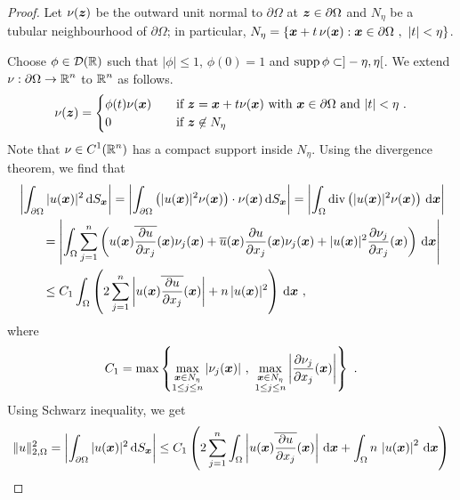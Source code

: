 \begin{proof}
Let $\nu({\bm{z}})$ be the outward unit normal to
$\partial \Omega$ at ${\bm{z}} \in \partial \Omega$ and
$N_\eta$ be a tubular neighbourhood of $\partial \Omega$; in
particular,
$\displaystyle N_\eta = \left\{ {\bm{x}} + t\, \nu({\bm{x}}) : {\bm{x}} \in
\partial \Omega \ , \ |t|<\eta \right\}$.

Choose $\displaystyle \phi \in \mathcal{D}(\mathbb{R})$ such that $|\phi|\leq 1$,
$\phi(0)=1$ and $\operatorname{supp} \phi \subset ]-\eta,\eta[$.
We extend $\displaystyle \nu:\partial \Omega \rightarrow \mathbb{R}^n$
to $\displaystyle \mathbb{R}^n$ as follows.
\[
\nu(\VEC{z}) =
\begin{cases}
\phi(t)\nu(\VEC{x}) & \quad \text{if}
\ \VEC{z} = \VEC{x}+t\nu(\VEC{x}) \ \text{with} \ 
\VEC{x} \in \partial \Omega\ \text{and} \ |t|<\eta \ . \\
0 & \quad \text{if}\ \VEC{z} \not\in N_\eta
\end{cases}
\]
Note that $\displaystyle \nu \in C^1(\mathbb{R}^n)$ has a compact support inside
$N_\eta$.  Using the divergence theorem, we find that
\begin{align*}
&\left| \int_{\partial \Omega} |u({\bm{x}})|^2 \,\mathrm{d}{S}_{{\bm{x}}} \right|
= \left| \int_{\partial \Omega} \left( |u({\bm{x}})|^2
\nu({\bm{x}})\right)\cdot \nu({\bm{x}}) \,\mathrm{d}{S}_{{\bm{x}}}
\right|
= \left| \int_{\Omega} \operatorname{div} \left( |u({\bm{x}})|^2
\nu({\bm{x}})\right) \,\mathrm{d}{{\bm{x}}} \right| \\
&\qquad = \left| \int_{\Omega} \sum_{j=1}^n
\left( u({\bm{x}}) \overline{\frac{\partial{u}}{\partial x_j}}({\bm{x}}) \nu_j({\bm{x}})
+ \overline{u}({\bm{x}}) \frac{\partial{u}}{\partial x_j}({\bm{x}}) \nu_j({\bm{x}})
+ |u({\bm{x}})|^2 \frac{\partial{\nu_j}}{\partial x_j}({\bm{x}}) \right) \,\mathrm{d}{{\bm{x}}}
\right| \\
&\qquad \leq C_1 \int_{\Omega}
\left( 2 \sum_{j=1}^n
\left|u({\bm{x}}) \overline{\frac{\partial{u}}{\partial x_j}}({\bm{x}})\right|
+ n\,|u({\bm{x}})|^2 \right) \,\mathrm{d}{{\bm{x}}} \  ,
\end{align*}
where
\[
C_1 = \max \left\{
\max_{\substack{\VEC{x}\in N_\eta\\ 1\leq j\leq n}} 
|\nu_j(\VEC{x})| \ , \ 
\max_{\substack{\VEC{x}\in N_\eta\\ 1\leq j\leq n}} 
\left|\pdydx{\nu_j}{x_j}(\VEC{x})\right| \right\} \  .
\]
Using Schwarz inequality, we get
\begin{align*}
\|u\|_{2,\Omega}^2
&=\left| \int_{\partial \Omega} |u(\VEC{x})|^2 \dss{S}{x} \right|
\leq C_1 \left( 2 \sum_{j=1}^n \int_{\Omega}
\left|u(\VEC{x}) \overline{\pdydx{u}{x_j}}(\VEC{x})\right| \dx{\VEC{x}}
+ \int_{\Omega} n\,\left|u(\VEC{x})\right|^2 \dx{\VEC{x}} \right) \\

\end{align*}
\end{proof}
